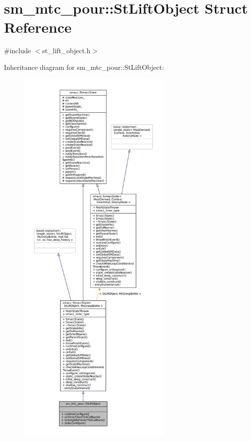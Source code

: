 \hypertarget{structsm__mtc__pour_1_1StLiftObject}{}\section{sm\+\_\+mtc\+\_\+pour\+:\+:St\+Lift\+Object Struct Reference}
\label{structsm__mtc__pour_1_1StLiftObject}


{\ttfamily \#include $<$st\+\_\+lift\+\_\+object.\+h$>$}



Inheritance diagram for sm\+\_\+mtc\+\_\+pour\+:\+:St\+Lift\+Object\+:
\nopagebreak
\begin{figure}[H]
\begin{center}
\leavevmode
\includegraphics[height=550pt]{structsm__mtc__pour_1_1StLiftObject__inherit__graph}
\end{center}
\end{figure}


